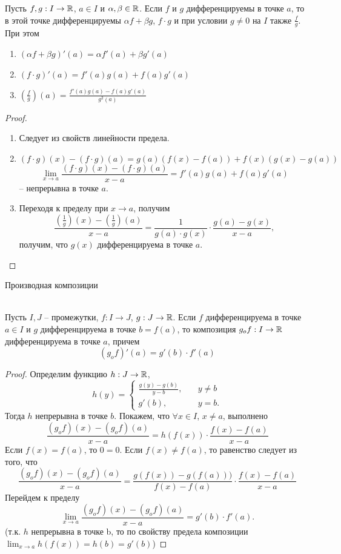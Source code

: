 \begin{theorem}\hypertarget{th2}{}
    Пусть $f, g: I \to \mathbb{R}$, $a \in I$ и $\alpha, \beta \in \mathbb{R}$.
    Если $f$ и $g$ дифференцируемы в точке $a$, то в этой точке дифференцируемы $\alpha f + \beta g$, $f \cdot g$ и при условии $g \neq 0$ на $I$ также $\frac{f}{g}$. При этом 
    \begin{enumerate}
        \item $(\alpha f + \beta g)'(a) = \alpha f'(a) + \beta g'(a)$
        \item $(f \cdot g)'(a) = f'(a)g(a) + f(a)g'(a)$
        \item $(\frac{f}{g})(a) = \frac{f'(a)g(a) - f(a)g'(a)}{g^{2}(a)}$
    \end{enumerate}
\end{theorem}

\begin{proof}
    \begin{enumerate}
        \item Следует из свойств линейности предела.
        \item \[(f \cdot g)(x) - (f \cdot g)(a) = g(a)(f(x) - f(a)) + f(x)(g(x) - g(a))\]
    \[\lim_{x \to a} \frac{(f \cdot g)(x) - (f \cdot g)(a)}{x - a} = f'(a) g(a) + f(a) g'(a)\]
    -- непрерывна в точке $a$.
        \item Переходя к пределу при $x \to a$, получим
    \[\frac{(\frac{1}{g})(x) - (\frac{1}{g})(a)}{x - a} = \frac{1}{g(a) \cdot g(x)} \cdot \frac{g(a) - g(x)}{x - a},\]
    получим, что $g(x)$ дифференцируема в точке $a$.
    \end{enumerate}
\end{proof}

\begin{theorem}\hypertarget{th3}{Производная композиции}
    \\
    Пусть $I, J$ -- промежутки, $f: I \to J$, $g: J \to \mathbb{R}$. Если $f$ дифференцируема в точке $a \in I$ и $g$ дифференцируема в точке $b = f(a)$, то композиция $g_{o}f: I \to \mathbb{R}$ дифференцируема в точке $a$, причем
    \[(g_{o}f)'(a) = g'(b) \cdot f'(a)\]
\end{theorem}

\begin{proof}
    Определим функцию $h: J \to \mathbb{R}$, 
    \[ h(y) =
    \begin{cases}
        \frac{g(y) - g(b)}{y - b},       & \quad y \neq b\\
        g'(b),  & \quad y = b.
    \end{cases}
    \]
    Тогда $h$ непрерывна в точке $b$. Покажем, что $\forall x \in I$, $x \neq a$, выполнено
    \[\frac{(g_{o}f)(x) - (g_{o}f)(a)}{x - a} = h(f(x)) \cdot \frac{f(x) - f(a)}{x - a}\]
    Если $f(x) = f(a)$, то $0 = 0$. Если $f(x) \neq f(a)$, то равенство следует из того, что
    \[\frac{(g_{o}f)(x) - (g_{o}f)(a)}{x - a} = \frac{g(f(x)) - g(f(a)))}{f(x) - f(a)} \cdot \frac{f(x) - f(a)}{x - a}\]
    Перейдем к пределу
    \[\lim_{x \to a} \frac{(g_{o}f)(x) - (g_{o}f)(a)}{x - a} = g'(b)\cdot f'(a).\]
    (т.к. $h$ непрерывна в точке b, то по свойству предела композиции $\lim_{x \to a} h(f(x)) = h(b) = g'(b)$)
\end{proof}

